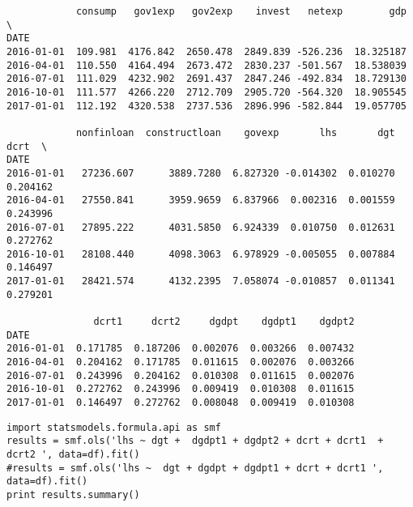 \documentclass[12pt,fleqn]{article}\usepackage{../../common}
\begin{document}
\begin{verbatim}
            consump   gov1exp   gov2exp    invest   netexp        gdp  \
DATE                                                                    
2016-01-01  109.981  4176.842  2650.478  2849.839 -526.236  18.325187   
2016-04-01  110.550  4164.494  2673.472  2830.237 -501.567  18.538039   
2016-07-01  111.029  4232.902  2691.437  2847.246 -492.834  18.729130   
2016-10-01  111.577  4266.220  2712.709  2905.720 -564.320  18.905545   
2017-01-01  112.192  4320.538  2737.536  2896.996 -582.844  19.057705   

            nonfinloan  constructloan    govexp       lhs       dgt      dcrt  \
DATE                                                                            
2016-01-01   27236.607      3889.7280  6.827320 -0.014302  0.010270  0.204162   
2016-04-01   27550.841      3959.9659  6.837966  0.002316  0.001559  0.243996   
2016-07-01   27895.222      4031.5850  6.924339  0.010750  0.012631  0.272762   
2016-10-01   28108.440      4098.3063  6.978929 -0.005055  0.007884  0.146497   
2017-01-01   28421.574      4132.2395  7.058074 -0.010857  0.011341  0.279201   

               dcrt1     dcrt2     dgdpt    dgdpt1    dgdpt2  
DATE                                                          
2016-01-01  0.171785  0.187206  0.002076  0.003266  0.007432  
2016-04-01  0.204162  0.171785  0.011615  0.002076  0.003266  
2016-07-01  0.243996  0.204162  0.010308  0.011615  0.002076  
2016-10-01  0.272762  0.243996  0.009419  0.010308  0.011615  
2017-01-01  0.146497  0.272762  0.008048  0.009419  0.010308  
\end{verbatim}

\begin{verbatim}
import statsmodels.formula.api as smf
results = smf.ols('lhs ~ dgt +  dgdpt1 + dgdpt2 + dcrt + dcrt1  + dcrt2 ', data=df).fit()
#results = smf.ols('lhs ~  dgt + dgdpt + dgdpt1 + dcrt + dcrt1 ', data=df).fit()
print results.summary()
\end{verbatim}
\end{document}
